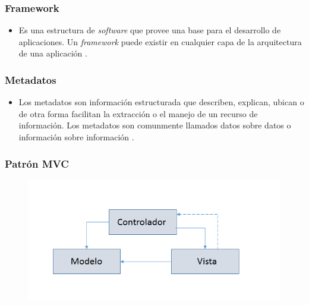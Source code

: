 \documentclass{beamer}
\begin{document}
\begin{frame}[fragile]
\frametitle{Framework}
\begin{itemize}
	\item Es una estructura de \textit{software} que provee una base para el desarrollo de aplicaciones.  Un \textit{framework} puede existir en cualquier capa de la arquitectura de una aplicación \cite{MTFW1}.
\end{itemize}


\end{frame}




\begin{frame}[fragile]
\frametitle{Metadatos}

\begin{itemize}
	\item Los metadatos son información estructurada que describen, explican, ubican o de otra forma facilitan la extracción o el manejo de un recurso de información.  Los metadatos son comunmente llamados datos sobre datos o información sobre información \cite{MTMD}.
\end{itemize}



\end{frame}




\begin{frame}[fragile]
\frametitle{Patrón MVC}

\begin{figure}[H]
  \centering
  \includegraphics[scale=0.6,type=png,ext=.png,read=.png,angle=0,origin=c]{../imagenes/MVC}
\end{figure}

\end{frame}
\end{document}
